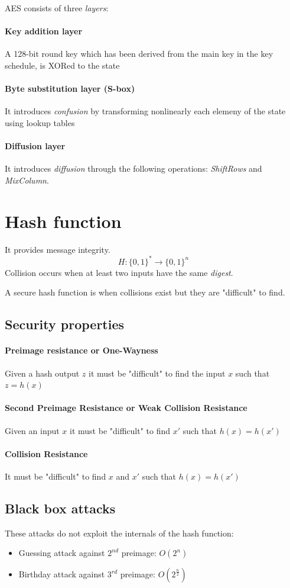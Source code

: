\documentclass[a4paper,12pt]{article}
\begin{document}
AES consists of three \textit{layers}:
\paragraph{Key addition layer} A 128-bit round key which has been derived from the main key in the key schedule, is XORed to the state
\paragraph{Byte substitution layer (S-box)} It introduces \textit{confusion} by transforming nonlinearly each elemeny of the state using lookup tables
\paragraph{Diffusion layer} It introduces \textit{diffusion} through the following operations: \textit{ShiftRows} and \textit{MixColumn}.

\section{Hash function}
It provides message integrity.
$$ H : \{0,1\}^* \rightarrow \{0,1\}^n $$
Collision occurs when at least two inputs have the same \textit{digest}.

A secure hash function is when collisions exist but they are "difficult" to find.

\subsection{Security properties}
\paragraph{Preimage resistance or One-Wayness}
Given a hash output $z$ it must be "difficult" to find the input $x$ such that $z = h(x)$
\paragraph{Second Preimage Resistance or Weak Collision Resistance}
Given an input $x$ it must be "difficult" to find $x'$ such that $h(x) = h(x')$
\paragraph{Collision Resistance}
It must be "difficult" to find $x$ and $x'$ such that $h(x) = h(x')$

\subsection{Black box attacks}
These attacks do not exploit the internals of the hash function:
\begin{itemize}
	\item Guessing attack against $2^{nd}$ preimage: $O(2^n)$
	\item Birthday attack against $3^{rd}$ preimage: $O(2^{\frac{n}{2}})$
\end{itemize}
\end{document}
